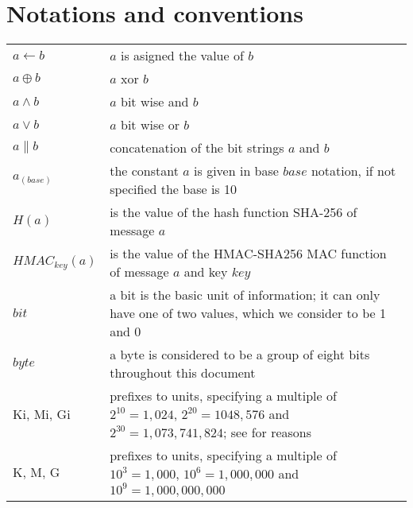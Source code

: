 \section{Notations and conventions}
\begin{tabular}{lp{10cm}}
$a \leftarrow b$ & $a$ is asigned the value of $b$\\
$a \oplus b$     & $a$ xor $b$ \\
$a \wedge b$     & $a$ bit wise and $b$ \\
$a \vee b$       & $a$ bit wise or $b$ \\
$a \parallel b$  & concatenation of the bit strings $a$ and $b$ \\
$a_{(base)}$     & the constant $a$ is given in base $base$ notation, if not specified the base is 10\\
$H(a)$           & is the value of the hash function SHA-256 of message $a$ \\
$HMAC_{key}(a)$  & is the value of the HMAC-SHA256 MAC function of message $a$ and key $key$ \\
$bit$            & a bit is the basic unit of information; it can only have one of two values, which we consider to be 1 and 0 \\
$byte$           & a byte is considered to be a group of eight bits throughout this document \\
Ki, Mi, Gi       & prefixes to units, specifying a multiple of $2^{10} = 1,024$, $2^{20} = 1048,576$ and $2^{30} = 1,073,741,824$; see \cite{IEC60027-2} for reasons \\
K, M, G          & prefixes to units, specifying a multiple of $10^3 = 1,000$, $10^6 = 1,000,000$ and $10^9=1,000,000,000$ \\ 
\end{tabular}
